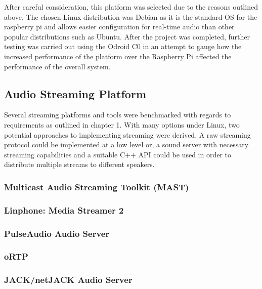 \documentclass[main.tex]{subfiles}
\begin{document}
\medskip
After careful consideration, this platform was selected due to the reasons outlined above. 
The chosen Linux distribution was Debian as it is the standard OS for the raspberry pi and allows easier configuration for real-time audio than other popular distributions such as Ubuntu. 
After the project was completed, further testing was carried out using the Odroid C0 in an attempt to gauge how the increased performance of the platform over the Raspberry Pi affected the performance of the overall system. 

\subsection{Audio Streaming Platform}
Several streaming platforms and tools were benchmarked with regards to requirements as outlined in chapter 1. 
With many options under Linux, two potential approaches to implementing streaming were derived. 
A raw streaming protocol could be implemented at a low level or, a sound server with necessary streaming capabilities and a suitable C++ API could be used in order to distribute multiple streams to different speakers.

\medskip

\medskip

\subsubsection{Multicast Audio Streaming Toolkit (MAST)}

\subsubsection{Linphone: Media Streamer 2}

\subsubsection{PulseAudio Audio Server}

\subsubsection{oRTP}

\subsubsection{JACK/netJACK Audio Server}
\end{document}
